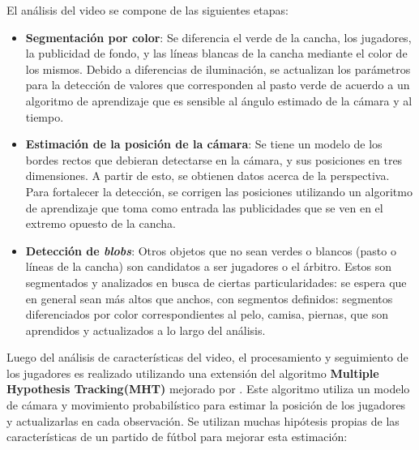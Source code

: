 \documentclass[a4paper,10pt]{article}
\begin{document}
El análisis del video se compone de las siguientes etapas:

\begin{itemize}

  \item \textbf{Segmentación por color}: Se diferencia el verde de la cancha,
    los jugadores, la publicidad de fondo, y las líneas blancas de la cancha
    mediante el color de los mismos. Debido a diferencias de iluminación, se
    actualizan los parámetros para la detección de valores que corresponden al
    pasto verde de acuerdo a un algoritmo de aprendizaje que es sensible al
    ángulo estimado de la cámara y al tiempo.

  \item \textbf{Estimación de la posición de la cámara}: Se tiene un modelo de
    los bordes rectos que debieran detectarse en la cámara, y sus posiciones en
    tres dimensiones. A partir de esto, se obtienen datos acerca de la
    perspectiva. Para fortalecer la detección, se corrigen las posiciones
    utilizando un algoritmo de aprendizaje que toma como entrada las
    publicidades que se ven en el extremo opuesto de la cancha.

  \item \textbf{Detección de \textit{blobs}}: Otros objetos que no sean verdes
    o blancos (pasto o líneas de la cancha) son candidatos a ser jugadores o el
    árbitro. Estos son segmentados y analizados en busca de ciertas
    particularidades: se espera que en general sean más altos que anchos, con
    segmentos definidos: segmentos diferenciados por color correspondientes al
    pelo, camisa, piernas, que son aprendidos y actualizados a lo largo del
    análisis.

\end{itemize}

Luego del análisis de características del video, el procesamiento y seguimiento
de los jugadores es realizado utilizando una extensión del algoritmo
\textbf{Multiple Hypothesis Tracking(MHT)} \cite{MHT-1, MHT-2} mejorado por
\citeauthor*{Schmitt-1}\cite{Schmitt-2}. Este algoritmo utiliza un modelo de
cámara y movimiento probabilístico para estimar la posición de los jugadores y
actualizarlas en cada observación. Se utilizan muchas hipótesis propias de las
características de un partido de fútbol para mejorar esta estimación:
\end{document}
